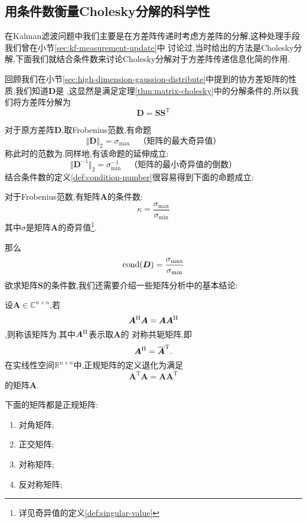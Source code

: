 \documentclass[cn,10pt,citestyle=gb7714-2015,bibstyle=gb7714-2015]{elegantbook}
\newcommand{\mT}{\mathrm{T}}
\begin{document}
\subsection{用条件数衡量Cholesky分解的科学性}
在Kalman滤波问题中我们主要是在方差阵传递时考虑方差阵的分解,这种处理手段我们曾在小节\ref{sec:kf-measurement-update}中
讨论过,当时给出的方法是Cholesky分解,下面我们就结合条件数来讨论Cholesky分解对于方差阵传递信息化简的作用.

回顾我们在小节\ref{sec:high-dimension-gaussion-distribute}中提到的协方差矩阵的性质,我们知道$\bm{D}$是
,这显然是满足定理\ref{thm:matrix-cholesky}中的分解条件的,所以我们将方差阵分解为
\[
  \bm{D}=\bm{S}\bm{S}^\mT
\]

对于原方差阵$\bm{D}$,取Frobenius范数,有命题
\[
  \Vert\bm{D}\Vert_2=\sigma_{\max}\quad\text{（矩阵的最大奇异值）}
\]
称此时的范数为.同样地,有该命题的延伸成立:
\[
  \Vert\bm{D}^{-1}\Vert_2=\sigma_{\min}^{-1}\quad\text{（矩阵的最小奇异值的倒数）}
\]
结合条件数的定义\ref{def:condition-number}很容易得到下面的命题成立:
\begin{proposition}[Frobenius范数情况下的条件数]\label{pro:Frobenius-condition-number}
  对于Frobenius范数,有矩阵$\bm{A}$的条件数:
  \[
    \kappa=\frac{\sigma_{\max}}{\sigma_{\min}}
  \]
  其中$\sigma$是矩阵$\bm{A}$的奇异值\footnote{详见奇异值的定义\ref{def:singular-value}}.
\end{proposition}
那么
\[
  \textup{cond}(\bm{D})=\frac{\sigma_{\max}}{\sigma_{\min}}
\]
欲求矩阵$\bm{S}$的条件数,我们还需要介绍一些矩阵分析中的基本结论:
\begin{definition}[正规矩阵]\label{def:normal-matrix}
  设$\bm{A}\in\mathbb{C}^{n\times n}$,若
  \[
    \bm{A}^{\textup{H}}\bm{A}=\bm{A}\bm{A}^{\textup{H}}
  \],则称该矩阵为.其中$\bm{A}^{\textup{H}}$表示取$\bm{A}$的
  对称共轭矩阵,即
  \[
    \bm{A}^{\textup{H}}=\overline{\bm{A}}^\mT.
  \]
  在实线性空间$\mathbb{R}^{n\times n}$中,正规矩阵的定义退化为满足
  \[
    \bm{A}^\mT\bm{A}=\bm{A}\bm{A}^\mT
  \]
  的矩阵$\bm{A}$.
\end{definition}
\begin{lemma}\label{lem:which-is-normal-matrix}
  下面的矩阵都是正规矩阵:
  \begin{enumerate}
    \item 对角矩阵;
    \item 正交矩阵;
    \item 对称矩阵;
    \item 反对称矩阵;
  \end{enumerate}
\end{lemma}
\end{document}
